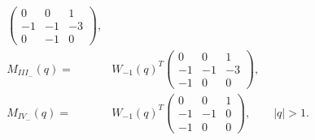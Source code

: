 \documentclass[12pt,reqno]{amsart}
\theoremstyle{definition}
\begin{document}
\begin{itemize}
\begin{align}
  \begin{pmatrix}
    0&0&1\\
    -1&-1&-3\\
    0&-1&0
  \end{pmatrix},\\
  M_{III_-}(q) =
  &W_{-1}(q)^T
  \begin{pmatrix}
    0&0&1\\
    -1&-1&-3\\
    -1&0&0
  \end{pmatrix},\\
  M_{IV_-}(q) =
  &W_{-1}(q)^T
  \begin{pmatrix}
    0&0&1\\
    -1&-1&0\\
    -1&0&0
  \end{pmatrix},\qquad |q|>1 .
 \end{align}
 
\end{itemize}
\end{document}
